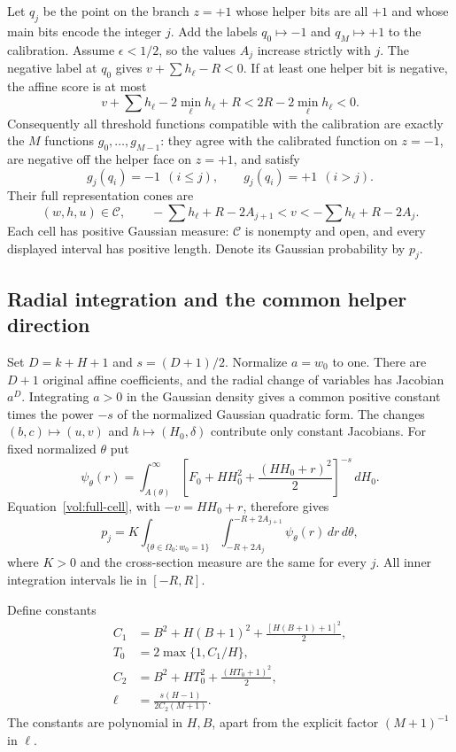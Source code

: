 Let $q_j$ be the point on the branch $z=+1$ whose helper bits are all $+1$
and whose main bits encode the integer $j$. Add the labels $q_0\mapsto-1$
and $q_M\mapsto+1$ to the calibration. Assume $\epsilon<1/2$, so the values
$A_j$ increase strictly with $j$.
The negative label at $q_0$ gives $v+\sum h_\ell-R<0$.
If at least one helper bit is negative, the affine score is at most
\[
 v+\sum h_\ell-2\min_\ell h_\ell+R
 <2R-2\min_\ell h_\ell<0.
\]
Consequently all threshold functions compatible with the calibration are
exactly the $M$ functions $g_0,\ldots,g_{M-1}$: they agree with the calibrated
function on $z=-1$, are negative off the helper face on $z=+1$, and satisfy
\[
 g_j(q_i)=-1\ \ (i\le j),\qquad
 g_j(q_i)=+1\ \ (i>j).
\]
Their full representation cones are
\begin{equation}\label{vol:full-cell}
 (w,h,u)\in\mathcal C,\qquad
 -\sum h_\ell+R-2A_{j+1}<v<-\sum h_\ell+R-2A_j.
\end{equation}
Each cell has positive Gaussian measure: $\mathcal C$ is nonempty and open,
and every displayed interval has positive length. Denote its Gaussian
probability by $p_j$.

\subsection{Radial integration and the common helper direction}

Set $D=k+H+1$ and $s=(D+1)/2$. Normalize $a=w_0$ to one.
There are $D+1$ original affine coefficients, and the radial change of
variables has Jacobian $a^D$. Integrating $a>0$ in the Gaussian density gives
a common positive constant times the power $-s$ of the normalized Gaussian
quadratic form. The changes $(b,c)\mapsto(u,v)$ and
$h\mapsto(H_0,\delta)$ contribute only constant Jacobians.
For fixed normalized $\theta$ put
\begin{equation}\label{vol:psi}
 \psi_\theta(r)=\int_{A(\theta)}^\infty
 \left[F_0+HH_0^2+\frac{(HH_0+r)^2}{2}\right]^{-s}\,dH_0.
\end{equation}
Equation~\eqref{vol:full-cell}, with $-v=HH_0+r$, therefore gives
\begin{equation}\label{vol:mass-integral}
 p_j=K\int_{\{\theta\in\Omega_0:w_0=1\}}
 \int_{-R+2A_j}^{-R+2A_{j+1}}\psi_\theta(r)\,dr\,d\theta,
\end{equation}
where $K>0$ and the cross-section measure are the same for every $j$.
All inner integration intervals lie in $[-R,R]$.

Define constants
\begin{align*}
 C_1&=B^2+H(B+1)^2+\frac{[H(B+1)+1]^2}{2},\\
 T_0&=2\max\{1,C_1/H\},\\
 C_2&=B^2+HT_0^2+\frac{(HT_0+1)^2}{2},\\
 \ell&=\frac{s(H-1)}{2C_2(M+1)}.
\end{align*}
The constants are polynomial in $H,B$, apart from the explicit factor
$(M+1)^{-1}$ in $\ell$.

